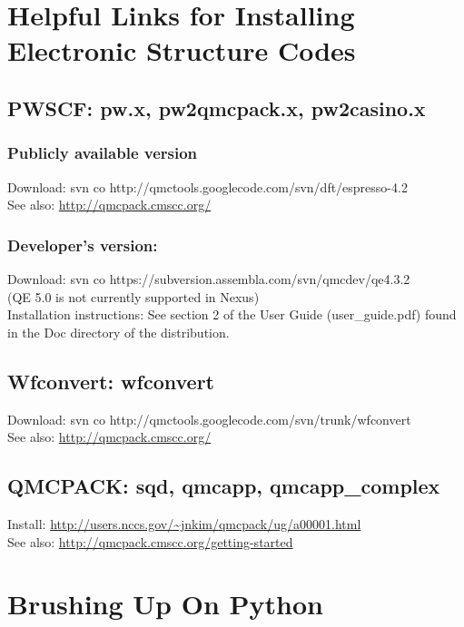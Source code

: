 \documentclass[oneside,11pt]{memoir}
\numberwithin{equation}{section}
\begin{document}
\section{Helpful Links for Installing Electronic Structure Codes} \label{install_code}
\subsection{PWSCF: pw.x, pw2qmcpack.x, pw2casino.x}
  \subsubsection{Publicly available version}
  Download: svn co http://qmctools.googlecode.com/svn/dft/espresso-4.2 \\
  See also: \url{http://qmcpack.cmscc.org/}\\
  \subsubsection{Developer's version:} 
  Download: svn co https://subversion.assembla.com/svn/qmcdev/qe4.3.2 \\
  (QE 5.0 is not currently supported in Nexus)\\
  Installation instructions: See section 2 of the User Guide (user\_guide.pdf) 
  found in the Doc directory of the distribution.

\subsection{Wfconvert: wfconvert}
  Download: svn co http://qmctools.googlecode.com/svn/trunk/wfconvert \\
  See also: \url{http://qmcpack.cmscc.org/}
\subsection{QMCPACK: sqd, qmcapp, qmcapp\_complex}
  Install: \url{http://users.nccs.gov/~jnkim/qmcpack/ug/a00001.html}\\
  See also: \url{http://qmcpack.cmscc.org/getting-started}


\section{Brushing Up On Python}\label{learn_python}
\end{document}
